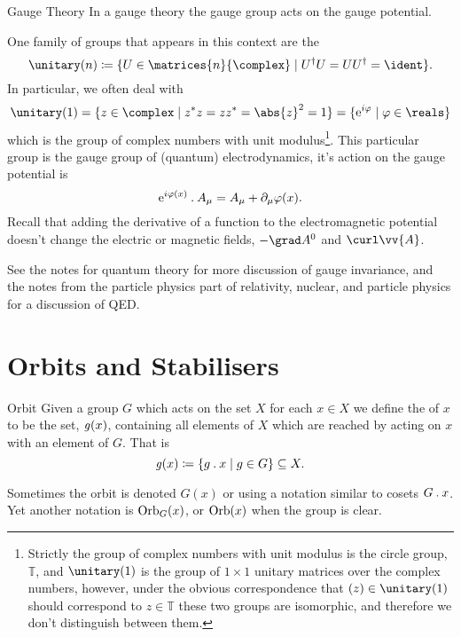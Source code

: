 \begin{app}{Gauge Theory}{}
    In a gauge theory the gauge group acts on the gauge potential.
    
    One family of groups that appears in this context are the 
    \begin{equation}
        \unitary(n) \coloneqq \{ U \in \matrices{n}{\complex} \mid U^\hermit U = UU^\hermit = \ident \}.
    \end{equation}
    In particular, we often deal with
    \begin{equation}
        \unitary(1) = \{z \in \complex \mid z^*z = zz^* = \abs{z}^2 = 1 \} = \{\e^{i\varphi} \mid \varphi \in \reals \}
    \end{equation}
    which is the group of complex numbers with unit modulus\footnote{Strictly the group of complex numbers with unit modulus is the circle group, \(\mathbb{T}\), and \(\unitary(1)\) is the group of \(1\times 1\) unitary matrices over the complex numbers, however, under the obvious correspondence that \((z) \in \unitary(1)\) should correspond to \(z \in \mathbb{T}\) these two groups are isomorphic, and therefore we don't distinguish between them.}.
    This particular group is the gauge group of (quantum) electrodynamics, it's action on the gauge potential is
    \begin{equation}
        \mathrm{e}^{i\varphi(x)} \mathbin{.} A_\mu = A_\mu + \partial_\mu \varphi(x).
    \end{equation}
    Recall that adding the derivative of a function to the electromagnetic potential doesn't change the electric or magnetic fields, \(-\grad A^0\) and \(\curl \vv{A}\).
    
    \begin{rmk}
        See the notes for quantum theory for more discussion of gauge invariance, and the notes from the particle physics part of relativity, nuclear, and particle physics for a discussion of QED.
    \end{rmk}
\end{app}

\section{Orbits and Stabilisers}

\begin{dfn}{Orbit}{}
    Given a group \(G\) which acts on the set \(X\) for each \(x \in X\) we define the  of \(x\) to be the set, \(\mathit{g}(x)\), containing all elements of \(X\) which are reached by acting on \(x\) with an element of \(G\).
    That is
    \begin{equation}
        \mathit{g}(x) \coloneqq \{g\mathbin{.} x \mid g \in G\} \subseteq X.
    \end{equation}
    \begin{ntn}{}{}
        Sometimes the orbit is denoted \(G(x)\) or using a notation similar to cosets \(G\mathbin{.} x\).
        Yet another notation is \(\operatorname{Orb}_G(x)\), or \(\operatorname{Orb}(x)\) when the group is clear.
    \end{ntn}
\end{dfn}

